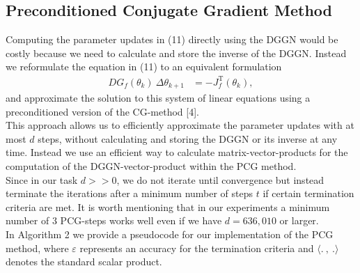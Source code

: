 \documentclass[conference]{IEEEtran}
\begin{document}
	\subsection{Preconditioned Conjugate Gradient Method}
	\noindent
	Computing the parameter updates in (11) directly using the DGGN would be costly because we need to calculate and store the inverse of the DGGN. Instead we reformulate the equation in (11) to an equivalent formulation
	\begin{align}
	DG_{f}(\theta_{k})\: \Delta\theta_{k+1} &= -J_{f}^{\mathrm{T}}(\theta_{k}),
	\end{align}
	and approximate the solution to this system of linear equations using a preconditioned version of the CG-method [4]. \\
	This approach allows us to efficiently approximate the parameter updates with at most $d$ steps, without calculating and storing the DGGN or its inverse at any time. Instead we use an efficient way to calculate matrix-vector-products for the computation of the DGGN-vector-product within the PCG method.\\
	Since in our task $d>>0$, we do not iterate until convergence but instead terminate the iterations after a minimum number of steps $t$ if certain termination criteria are met. It is worth mentioning that in our experiments a minimum number of 3 PCG-steps works well even if we have $d=636,010$ or larger. \\
	In Algorithm 2 we provide a pseudocode for our implementation of the PCG method, where $\varepsilon$ represents an accuracy for the termination criteria and $\langle .\:,\: .\rangle$ denotes the standard scalar product.
\end{document}
